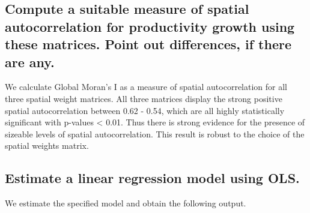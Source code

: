 \documentclass[
  a4paper,
]{article}
\begin{document}
\hypertarget{compute-a-suitable-measure-of-spatial-autocorrelation-for-productivity-growth-using-these-matrices.-point-out-differences-if-there-are-any.}{%
\subsection{Compute a suitable measure of spatial autocorrelation for
productivity growth using these matrices. Point out differences, if
there are
any.}\label{compute-a-suitable-measure-of-spatial-autocorrelation-for-productivity-growth-using-these-matrices.-point-out-differences-if-there-are-any.}}

We calculate Global Moran's I as a measure of spatial autocorrelation
for all three spatial weight matrices. All three matrices display the
strong positive spatial autocorrelation between 0.62 - 0.54, which are
all highly statistically significant with p-values \textless{} 0.01.
Thus there is strong evidence for the presence of sizeable levels of
spatial autocorrelation. This result is robust to the choice of the
spatial weights matrix.

\begin{table}
\centering
{}
\end{table}

\hypertarget{estimate-a-linear-regression-model-using-ols.}{%
\subsection{Estimate a linear regression model using
OLS.}\label{estimate-a-linear-regression-model-using-ols.}}

We estimate the specified model and obtain the following output.
\end{document}

